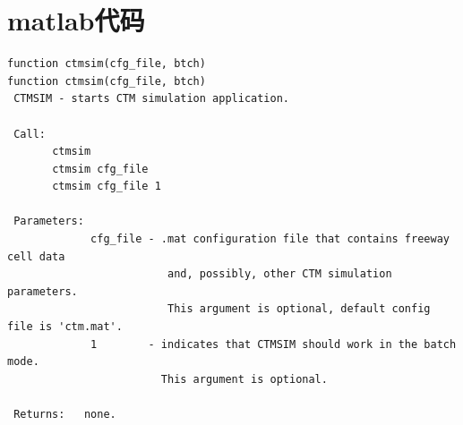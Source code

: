 \documentclass[UTF8,12.05pt]{ctexart}
\begin{document}
\section{matlab代码}
\begin{lstlisting}
function ctmsim(cfg_file, btch)
function ctmsim(cfg_file, btch)
 CTMSIM - starts CTM simulation application.

 Call:
       ctmsim
       ctmsim cfg_file
       ctmsim cfg_file 1

 Parameters:
             cfg_file - .mat configuration file that contains freeway cell data
                         and, possibly, other CTM simulation parameters.
                         This argument is optional, default config file is 'ctm.mat'.
             1        - indicates that CTMSIM should work in the batch mode.
                        This argument is optional.

 Returns:   none.



\end{lstlisting}
\end{document}
